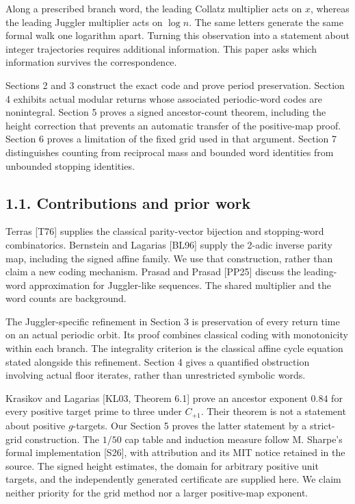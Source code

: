 \documentclass[11pt,a4paper]{article}
\begin{document}
Along a prescribed branch word, the leading Collatz multiplier acts on
\(x\), whereas the leading Juggler multiplier acts on \(\log n\). The
same letters generate the same formal walk one logarithm apart. Turning
this observation into a statement about integer trajectories requires
additional information. This paper asks which information survives the
correspondence.

Sections 2 and 3 construct the exact code and prove period preservation.
Section 4 exhibits actual modular returns whose associated periodic-word
codes are nonintegral. Section 5 proves a signed ancestor-count theorem,
including the height correction that prevents an automatic transfer of
the positive-map proof. Section 6 proves a limitation of the fixed grid
used in that argument. Section 7 distinguishes counting from reciprocal
mass and bounded word identities from unbounded stopping identities.

\subsection{1.1. Contributions and prior
work}\label{contributions-and-prior-work}

Terras {[}T76{]} supplies the classical parity-vector bijection and
stopping-word combinatorics. Bernstein and Lagarias {[}BL96{]} supply
the 2-adic inverse parity map, including the signed affine family. We
use that construction, rather than claim a new coding mechanism. Prasad
and Prasad {[}PP25{]} discuss the leading-word approximation for
Juggler-like sequences. The shared multiplier and the word counts are
background.

The Juggler-specific refinement in Section 3 is preservation of every
return time on an actual periodic orbit. Its proof combines classical
coding with monotonicity within each branch. The integrality criterion
is the classical affine cycle equation stated alongside this refinement.
Section 4 gives a quantified obstruction involving actual floor
iterates, rather than unrestricted symbolic words.

Krasikov and Lagarias {[}KL03, Theorem 6.1{]} prove an ancestor exponent
\(0.84\) for every positive target prime to three under \(C_{+1}\).
Their theorem is not a statement about positive \(g\)-targets. Our
Section 5 proves the latter statement by a strict-grid construction. The
\(1/50\) cap table and induction measure follow M. Sharpe's formal
implementation {[}S26{]}, with attribution and its MIT notice retained
in the source. The signed height estimates, the domain for arbitrary
positive unit targets, and the independently generated certificate are
supplied here. We claim neither priority for the grid method nor a
larger positive-map exponent.
\end{document}
